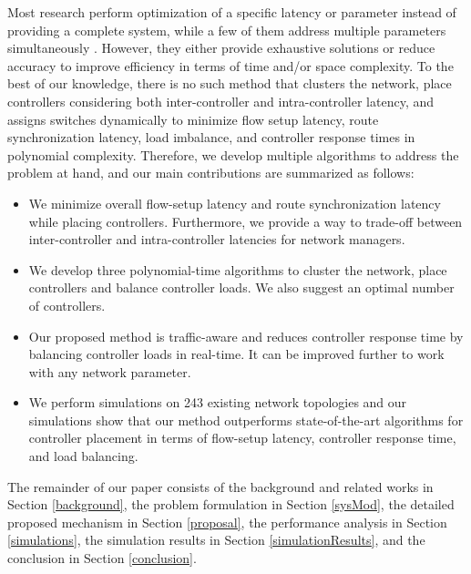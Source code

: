 \documentclass[a4paper,fleqn]{cas-dc}
\begin{document}
Most research perform optimization of a specific latency or parameter instead of providing a complete system, while a few of them address multiple parameters simultaneously \cite{lange2015multi, sallahi2015optimal}. However, they either provide exhaustive solutions or reduce accuracy to improve efficiency in terms of time and/or space complexity. To the best of our knowledge, there is no such method that clusters the network, place controllers considering both inter-controller and intra-controller latency, and assigns switches dynamically to minimize flow setup latency, route synchronization latency, load imbalance, and controller response times in polynomial complexity. Therefore, we develop multiple algorithms to address the problem at hand, and our main contributions are summarized as follows:
\begin{itemize}
	\item We minimize overall flow-setup latency and route synchronization latency while placing controllers. Furthermore, we provide a way to trade-off between inter-controller and intra-controller latencies for network managers.
	
	\item We develop three polynomial-time algorithms to cluster the network, place controllers and balance controller loads. We also suggest an optimal number of controllers.
	
	\item Our proposed method is traffic-aware and reduces controller response time by balancing controller loads in real-time. It can be improved further to work with any network parameter.
	
	\item We perform simulations on 243 existing network topologies and our simulations show that our method outperforms state-of-the-art algorithms for controller placement in terms of flow-setup latency, controller response time, and load balancing.
\end{itemize}


The remainder of our paper consists of the background and related works in Section \ref{background}, the problem formulation in Section \ref{sysMod}, the detailed proposed mechanism in Section \ref{proposal}, the performance analysis in Section \ref{simulations}, the simulation results in Section \ref{simulationResults}, and the conclusion in Section \ref{conclusion}.
\end{document}
